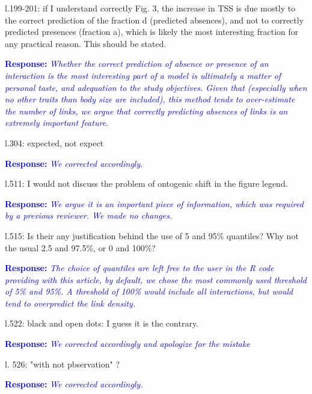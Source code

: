 \documentclass [12pt,onecolumn,twoside,openright]{report}
\begin{document}
\begin{onehalfspacing}
\medskip l.199-201: if I understand correctly Fig. 3, the
increase in TSS is due mostly to the correct prediction of the fraction d
(predicted absences), and not to correctly predicted presences (fraction a),
which is likely the most interesting fraction for any practical reason. This
should be stated.

\medskip\textcolor{blue}{\textbf{Response:}} \textit{\textcolor{blue}{Whether the
correct prediction of absence or presence of an interaction is the most
interesting part of a model is ultimately a matter of personal taste, and
adequation to the study objectives. Given that (especially when no other traits
than body size are included), this method tends to over-estimate the number of
links, we argue that correctly predicting absences of links is an extremely
important feature.}}
\medskip 

\medskip l.304: expected, not expect

\medskip\textcolor{blue}{\textbf{Response:}} \textit{\textcolor{blue}{We corrected
accordingly.}}

\medskip l.511: I would not discuss the problem of ontogenic
shift in the figure legend.

\medskip\textcolor{blue}{\textbf{Response:}} \textit{\textcolor{blue}{We argue it is an
important piece of information, which was required by a previous reviewer. We
made no changes.}}

\medskip l.515: Is their any justification behind the use of 5
and 95\% quantiles? Why not the usual 2.5 and 97.5\%, or 0 and 100\%?

\medskip\textcolor{blue}{\textbf{Response:}} \textit{\textcolor{blue}{The choice of quantiles are left free to the user in the R code providing with this article, by default, we chose the most commonly used threshold of 5\% and 95\%. A threshold of 100\% would include all interactions, but would tend to overpredict the link density.}}

\medskip l.522: black and open dots: I guess it is the
contrary.

\medskip\textcolor{blue}{\textbf{Response:}} \textit{\textcolor{blue}{We corrected accordingly and apologize for the mistake}}

\medskip l. 526: "with not pbservation" ?

\medskip\textcolor{blue}{\textbf{Response:}} \textit{\textcolor{blue}{We corrected
accordingly.}}


\end{onehalfspacing}
\end{document}
